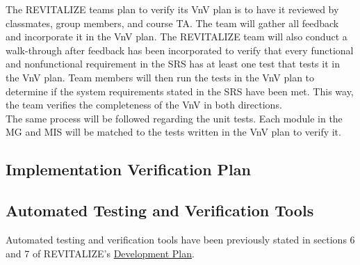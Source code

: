 \documentclass[12pt, titlepage]{article}
\begin{document}

The REVITALIZE teams plan to verify its VnV plan is to have it reviewed by classmates, group members, and course TA. The team will gather all feedback and incorporate it in the VnV plan. The REVITALIZE team will also conduct a walk-through after feedback has been incorporated to verify that every functional and nonfunctional requirement in the SRS has at least one test that tests it in the VnV plan. Team members will then run the tests in the VnV plan to determine if the system requirements stated in the SRS have been met. This way, the team verifies the completeness of the VnV in both directions.\\
The same process will be followed regarding the unit tests. Each module in the MG and MIS will be matched to the tests written in the VnV plan to verify it.

\subsection{Implementation Verification Plan}



\subsection{Automated Testing and Verification Tools}



Automated testing and verification tools have been previously stated in sections 6 and 7 of REVITALIZE's \href{https://github.com/BillNguyen1999/REVITALIZE/blob/main/docs/DevelopmentPlan/DevelopmentPlan.pdf}{\color{blue}Development Plan}.
\end{document}
